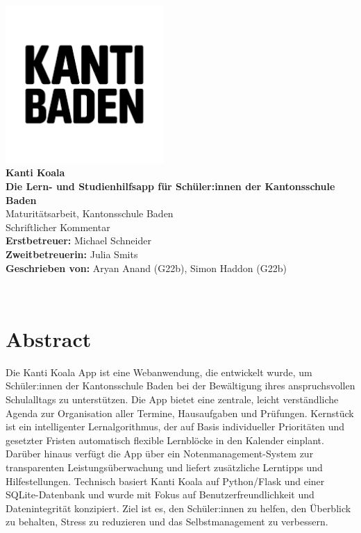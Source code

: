 \documentclass[12pt,a4paper]{report}
\begin{document}
\makeatletter
\begin{titlepage}
    \centering
    \vspace*{1cm}
       { \includegraphics[width=6cm]{img/kanti-baden.png}}\\[1cm]

    {\LARGE \textbf{Kanti Koala}}\\
    {\textbf{Die Lern- und Studienhilfsapp für Schüler:innen der Kantonsschule Baden}}\\[1cm]

    {Maturitätsarbeit, Kantonsschule Baden}\\
    {Schriftlicher Kommentar}\\[1cm]
    
    \textbf{Erstbetreuer: }{Michael Schneider}\\
    \textbf{Zweitbetreuerin: }{Julia Smits}\\[1cm]
    
    \textbf{Geschrieben von: }{Aryan Anand (G22b), Simon Haddon (G22b)}\\[1cm]
    \date{\large Datum: 11. November 2025}
    {\@date\\}
\end{titlepage}
\makeatother

\chapter*{Abstract}
Die Kanti Koala App ist eine Webanwendung, die entwickelt wurde, um Schüler:innen der Kantonsschule Baden bei der Bewältigung ihres anspruchsvollen Schulalltags zu unterstützen. 
Die App bietet eine zentrale, leicht verständliche Agenda zur Organisation aller Termine, Hausaufgaben und Prüfungen. 
Kernstück ist ein intelligenter Lernalgorithmus, der auf Basis individueller Prioritäten und gesetzter Fristen automatisch flexible Lernblöcke in den Kalender einplant. 
Darüber hinaus verfügt die App über ein Notenmanagement-System zur transparenten Leistungsüberwachung und liefert zusätzliche Lerntipps und Hilfestellungen. Technisch basiert Kanti Koala auf Python/Flask und einer SQLite-Datenbank und wurde mit Fokus auf Benutzerfreundlichkeit und Datenintegrität konzipiert. Ziel ist es, den Schüler:innen zu helfen, den Überblick zu behalten, Stress zu reduzieren und das Selbstmanagement zu verbessern.
\pagebreak
\end{document}
